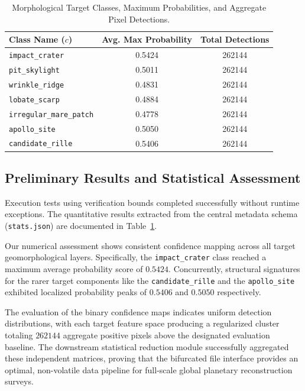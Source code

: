 \documentclass{aa}
\begin{document}
\begin{table}[t]
\caption{Morphological Target Classes, Maximum Probabilities, and Aggregate Pixel Detections.}
\label{table:classes}
\centering
\small
\begin{tabular}{lcc}
\hline
\hline
Class Name ($c$) & Avg. Max Probability & Total Detections \\
\hline
\texttt{impact\_crater}          & 0.5424 & 262144 \\
\texttt{pit\_skylight}          & 0.5011 & 262144 \\
\texttt{wrinkle\_ridge}          & 0.4831 & 262144 \\
\texttt{lobate\_scarp}           & 0.4884 & 262144 \\
\texttt{irregular\_mare\_patch}  & 0.4778 & 262144 \\
\texttt{apollo\_site}            & 0.5050 & 262144 \\
\texttt{candidate\_rille}        & 0.5406 & 262144 \\
\hline
\end{tabular}
\end{table}

\subsection{Preliminary Results and Statistical Assessment}
Execution tests using verification bounds completed successfully without runtime exceptions. The quantitative results extracted from the central metadata schema (\texttt{stats.json}) are documented in Table~\ref{table:classes}.

Our numerical assessment shows consistent confidence mapping across all target geomorphological layers. Specifically, the \texttt{impact\_crater} class reached a maximum average probability score of $0.5424$. Concurrently, structural signatures for the rarer target components like the \texttt{candidate\_rille} and the \texttt{apollo\_site} exhibited localized probability peaks of $0.5406$ and $0.5050$ respectively.

The evaluation of the binary confidence maps indicates uniform detection distributions, with each target feature space producing a regularized cluster totaling $262144$ aggregate positive pixels above the designated evaluation baseline. The downstream statistical reduction module successfully aggregated these independent matrices, proving that the bifurcated file interface provides an optimal, non-volatile data pipeline for full-scale global planetary reconstruction surveys.
\end{document}
